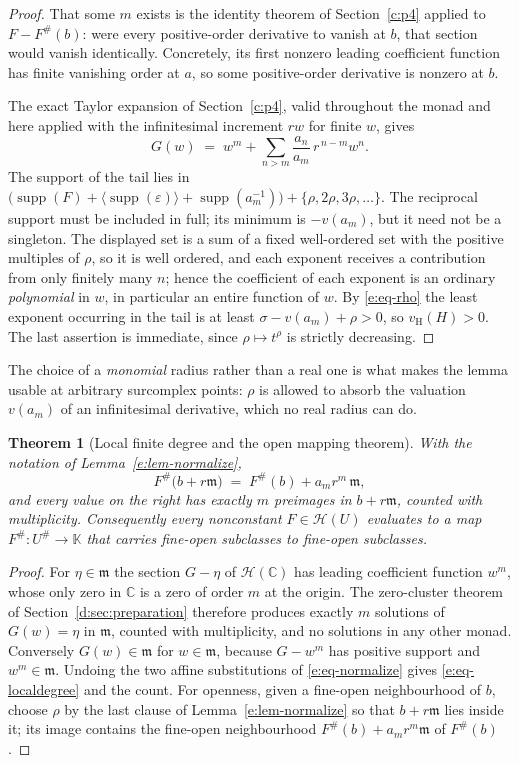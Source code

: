 \documentclass[11pt,a4paper]{article}
\numberwithin{equation}{section}
\newtheorem{theorem}{Theorem}[section]
\theoremstyle{definition}
\theoremstyle{remark}
\theoremstyle{plain}
\newcommand{\K}{\mathbb K}
\newcommand{\CC}{\mathbb C}
\newcommand{\mm}{\mathfrak m}
\DeclareMathOperator{\supp}{supp}
\newcommand{\tm}{t}
\newcommand{\halo}[1]{#1^{\#}}
\newcommand{\ev}[1]{#1^{\#}}
\newcommand{\Hc}{\mathcal H}
\newcommand{\vH}{v_{\mathrm H}}
\newcommand{\Neu}[1]{\langle #1\rangle}
\begin{document}
\begin{proof}
That some $m$ exists is the identity theorem of Section~\ref{c:p4} applied to
$F-\ev F(b)$: were every positive-order derivative to vanish at $b$, that
section would vanish identically.  Concretely, its first nonzero leading
coefficient function has finite vanishing order at $a$, so some
positive-order derivative is nonzero at $b$.

The exact Taylor expansion of Section~\ref{c:p4}, valid throughout the monad and here
applied with the infinitesimal increment $rw$ for finite $w$, gives
\[
 G(w)\;=\;w^m+\sum_{n>m}\frac{a_n}{a_m}\,r^{\,n-m}w^n .
\]
The support of the tail lies in
$\bigl(\supp(F)+\Neu{\supp(\varepsilon)}+\supp(a_m^{-1})\bigr)
 +\{\rho,2\rho,3\rho,\dots\}$.
The reciprocal support must be included in full; its minimum is
$-v(a_m)$, but it need not be a singleton. The displayed set is a sum
of a fixed well-ordered set with the positive multiples of $\rho$, so it is well ordered, and each exponent
receives a contribution from only finitely many $n$; hence the coefficient
of each exponent is an ordinary \emph{polynomial} in $w$, in particular an
entire function of $w$.  By \eqref{e:eq-rho} the least exponent occurring
in the tail is at least $\sigma-v(a_m)+\rho>0$, so $\vH(H)>0$.  The last
assertion is immediate, since $\rho\mapsto\tm^{\rho}$ is strictly
decreasing.
\end{proof}

The choice of a \emph{monomial} radius rather than a real one is what makes
the lemma usable at arbitrary surcomplex points: $\rho$ is allowed to
absorb the valuation $v(a_m)$ of an infinitesimal derivative, which no
real radius can do.

\begin{theorem}[Local finite degree and the open mapping theorem]
\label{e:thm-openmapping}
With the notation of Lemma~\ref{e:lem-normalize},
\begin{equation}\label{e:eq-localdegree}
 \ev F\bigl(b+r\mm\bigr)\;=\;\ev F(b)+a_mr^m\,\mm ,
\end{equation}
and every value on the right has exactly $m$ preimages in $b+r\mm$,
counted with multiplicity.  Consequently every nonconstant $F\in\Hc(U)$
evaluates to a map $\ev F:\halo U\to\K$ that carries fine-open subclasses
to fine-open subclasses.
\end{theorem}

\begin{proof}
For $\eta\in\mm$ the section $G-\eta$ of $\Hc(\CC)$ has leading
coefficient function $w^m$, whose only zero in $\CC$ is a zero of order
$m$ at the origin.  The zero-cluster theorem of Section~\ref{d:sec:preparation} therefore produces
exactly $m$ solutions of $G(w)=\eta$ in $\mm$, counted with multiplicity,
and no solutions in any other monad.  Conversely $G(w)\in\mm$ for $w\in\mm$,
because $G-w^m$ has positive support and $w^m\in\mm$.  Undoing the two
affine substitutions of \eqref{e:eq-normalize} gives
\eqref{e:eq-localdegree} and the count.  For openness, given a fine-open
neighbourhood of $b$, choose $\rho$ by the last clause of
Lemma~\ref{e:lem-normalize} so that $b+r\mm$ lies inside it; its image
contains the fine-open neighbourhood $\ev F(b)+a_mr^m\mm$ of $\ev F(b)$.
\end{proof}
\end{document}
